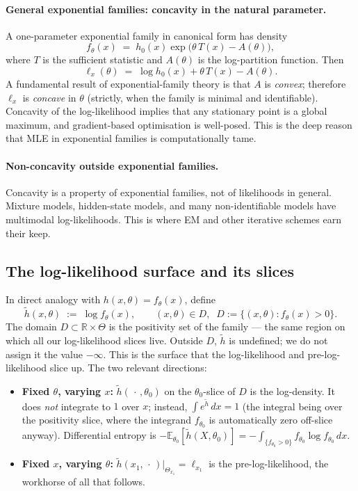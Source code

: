 \documentclass[a4paper,oneside,12pt]{extarticle}
\theoremstyle{plain}
\theoremstyle{definition}
\theoremstyle{remark}
\newcommand*{\E}{\mathbb{E}}
\begin{document}
\paragraph{General exponential families: concavity in the natural parameter.}
A one-parameter exponential family in canonical form has density
\[
  f_\theta(x) \;=\; h_0(x) \exp\!\bigl(\theta\,T(x) - A(\theta)\bigr),
\]
where $T$ is the sufficient statistic and $A(\theta)$ is the
log-partition function.  Then
\[
  \ell_x(\theta) \;=\; \log h_0(x) + \theta\,T(x) - A(\theta).
\]
A fundamental result of exponential-family theory is that $A$ is
\emph{convex}; therefore $\ell_x$ is \emph{concave} in $\theta$
(strictly, when the family is minimal and identifiable).  Concavity
of the log-likelihood implies that any stationary point is a global
maximum, and gradient-based optimisation is well-posed.  This is the
deep reason that MLE in exponential families is computationally tame.

\paragraph{Non-concavity outside exponential families.}
Concavity is a property of exponential families, not of likelihoods
in general.  Mixture models, hidden-state models, and many
non-identifiable models have multimodal log-likelihoods.  This is
where EM and other iterative schemes earn their keep.

\subsection{The log-likelihood surface and its slices}

In direct analogy with $h(x,\theta) = f_\theta(x)$, define
\[
  \tilde h(x,\theta) \;:=\; \log f_\theta(x),
  \qquad
  (x,\theta) \in D, \;\; D := \{(x,\theta): f_\theta(x) > 0\}.
\]
The domain $D \subset \mathbb{R}\times\Theta$ is the positivity set
of the family --- the same region on which all our log-likelihood
slices live.  Outside $D$, $\tilde h$ is undefined; we do not assign
it the value $-\infty$.  This is the surface that the log-likelihood
and pre-log-likelihood slice up.  The two relevant directions:

\begin{itemize}
\item \textbf{Fixed $\theta$, varying $x$:}
  $\tilde h(\,\cdot\,,\theta_0)$ on the $\theta_0$-slice of $D$ is the
  log-density.  It does \emph{not} integrate to $1$ over $x$; instead,
  $\int e^{\tilde h}\,dx = 1$ (the integral being over the positivity
  slice, where the integrand $f_{\theta_0}$ is automatically zero
  off-slice anyway).  Differential entropy is
  $-\E_{\theta_0}[\tilde h(X,\theta_0)] = -\int_{\{f_{\theta_0}>0\}}
  f_{\theta_0} \log f_{\theta_0}\,dx$.

\item \textbf{Fixed $x$, varying $\theta$:}
  $\tilde h(x_1,\,\cdot\,)|_{\Theta_{x_1}} = \ell_{x_1}$ is the
  pre-log-likelihood, the workhorse of all that follows.
\end{itemize}
\end{document}
